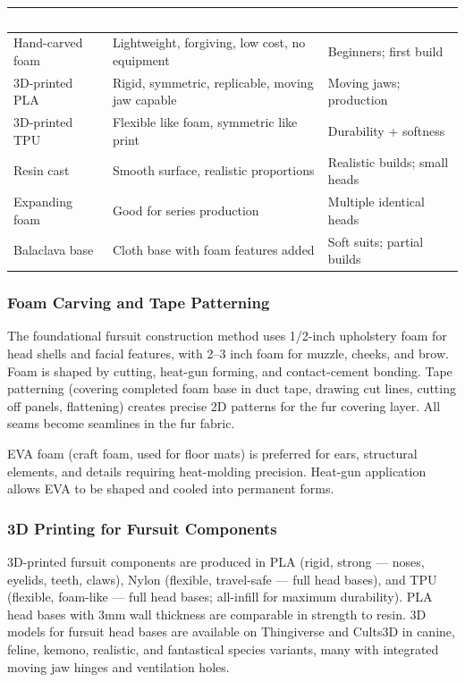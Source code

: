 \documentclass[11pt,letterpaper]{article}
\newcommand{\tableheader}[1]{\textbf{\sffamily\textcolor{white}{#1}}}
\begin{document}
\begin{center}
\begin{tabularx}{\textwidth}{L{3cm}XL{3cm}}
\toprule
{}
\tableheader{Base Type} & \tableheader{Properties} & \tableheader{Best For} \\
\midrule
Hand-carved foam & Lightweight, forgiving, low cost, no equipment & Beginners; first build \\
3D-printed PLA & Rigid, symmetric, replicable, moving jaw capable & Moving jaws; production \\
3D-printed TPU & Flexible like foam, symmetric like print & Durability + softness \\
Resin cast & Smooth surface, realistic proportions & Realistic builds; small heads \\
Expanding foam & Good for series production & Multiple identical heads \\
Balaclava base & Cloth base with foam features added & Soft suits; partial builds \\
\bottomrule
\end{tabularx}
\end{center}

\subsubsection{Foam Carving and Tape Patterning}

The foundational fursuit construction method uses 1/2-inch upholstery foam for head shells and facial features, with 2--3 inch foam for muzzle, cheeks, and brow. Foam is shaped by cutting, heat-gun forming, and contact-cement bonding. Tape patterning (covering completed foam base in duct tape, drawing cut lines, cutting off panels, flattening) creates precise 2D patterns for the fur covering layer. All seams become seamlines in the fur fabric.

EVA foam (craft foam, used for floor mats) is preferred for ears, structural elements, and details requiring heat-molding precision. Heat-gun application allows EVA to be shaped and cooled into permanent forms.

\subsubsection{3D Printing for Fursuit Components}

3D-printed fursuit components are produced in PLA (rigid, strong --- noses, eyelids, teeth, claws), Nylon (flexible, travel-safe --- full head bases), and TPU (flexible, foam-like --- full head bases; all-infill for maximum durability). PLA head bases with 3mm wall thickness are comparable in strength to resin. 3D models for fursuit head bases are available on Thingiverse and Cults3D in canine, feline, kemono, realistic, and fantastical species variants, many with integrated moving jaw hinges and ventilation holes.
\end{document}
